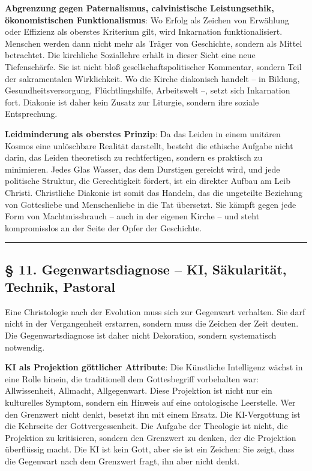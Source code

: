 \documentclass[
  ngerman,
]{article}
\begin{document}
\textbf{Abgrenzung gegen Paternalismus, calvinistische Leistungsethik,
ökonomistischen Funktionalismus}: Wo Erfolg als Zeichen von Erwählung
oder Effizienz als oberstes Kriterium gilt, wird Inkarnation
funktionalisiert. Menschen werden dann nicht mehr als Träger von
Geschichte, sondern als Mittel betrachtet. Die kirchliche Soziallehre
erhält in dieser Sicht eine neue Tiefenschärfe. Sie ist nicht bloß
gesellschaftspolitischer Kommentar, sondern Teil der sakramentalen
Wirklichkeit. Wo die Kirche diakonisch handelt -- in Bildung,
Gesundheitsversorgung, Flüchtlingshilfe, Arbeitswelt --, setzt sich
Inkarnation fort. Diakonie ist daher kein Zusatz zur Liturgie, sondern
ihre soziale Entsprechung.

\textbf{Leidminderung als oberstes Prinzip}: Da das Leiden in einem
unitären Kosmos eine unlöschbare Realität darstellt, besteht die
ethische Aufgabe nicht darin, das Leiden theoretisch zu rechtfertigen,
sondern es praktisch zu minimieren. Jedes Glas Wasser, das dem Durstigen
gereicht wird, und jede politische Struktur, die Gerechtigkeit fördert,
ist ein direkter Aufbau am Leib Christi. Christliche Diakonie ist somit
das Handeln, das die ungeteilte Beziehung von Gottesliebe und
Menschenliebe in die Tat übersetzt. Sie kämpft gegen jede Form von
Machtmissbrauch -- auch in der eigenen Kirche -- und steht kompromisslos
an der Seite der Opfer der Geschichte.

\begin{center}\rule{0.5\linewidth}{0.5pt}\end{center}

\subsection{§ 11. Gegenwartsdiagnose -- KI, Säkularität, Technik,
Pastoral}\label{gegenwartsdiagnose-ki-suxe4kularituxe4t-technik-pastoral}

Eine Christologie nach der Evolution muss sich zur Gegenwart verhalten.
Sie darf nicht in der Vergangenheit erstarren, sondern muss die Zeichen
der Zeit deuten. Die Gegenwartsdiagnose ist daher nicht Dekoration,
sondern systematisch notwendig.

\textbf{KI als Projektion göttlicher Attribute}: Die Künstliche
Intelligenz wächst in eine Rolle hinein, die traditionell dem
Gottesbegriff vorbehalten war: Allwissenheit, Allmacht, Allgegenwart.
Diese Projektion ist nicht nur ein kulturelles Symptom, sondern ein
Hinweis auf eine ontologische Leerstelle. Wer den Grenzwert nicht denkt,
besetzt ihn mit einem Ersatz. Die KI-Vergottung ist die Kehrseite der
Gottvergessenheit. Die Aufgabe der Theologie ist nicht, die Projektion
zu kritisieren, sondern den Grenzwert zu denken, der die Projektion
überflüssig macht. Die KI ist kein Gott, aber sie ist ein Zeichen: Sie
zeigt, dass die Gegenwart nach dem Grenzwert fragt, ihn aber nicht
denkt.
\end{document}
